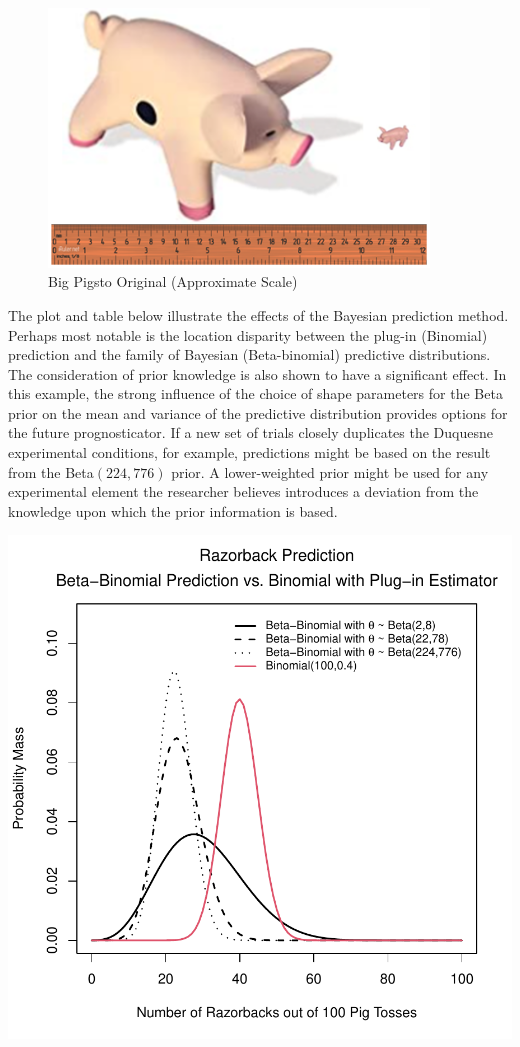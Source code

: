 \documentclass[12pt, a4paper]{article}
\begin{document}
\begin{figure}[ht]
  \centering
  \includegraphics[width=0.9\textwidth]{./Graphics/PassThePigs/PigSize_wRuler}
  \caption{Big Pigs\texttrademark to Original (Approximate Scale)}
\end{figure}


\noindent The plot and table below illustrate the effects of the Bayesian prediction method. Perhaps most notable is the location disparity between the plug-in (Binomial) prediction and the family of Bayesian (Beta-binomial) predictive distributions.  The consideration of prior knowledge is also shown to have a significant effect.  In this example, the strong influence of the choice of shape parameters for the Beta prior on the mean and variance of the predictive distribution provides options for the future prognosticator. If a new set of trials closely duplicates the Duquesne experimental conditions, for example, predictions might be based on the result from the Beta$(224,776)$ prior.  A lower-weighted prior might be used for any experimental element the researcher believes introduces a deviation from the knowledge upon which the prior information is based.

\vspace{1cm}

\includegraphics{Thesis_v4-002}
\end{document}
